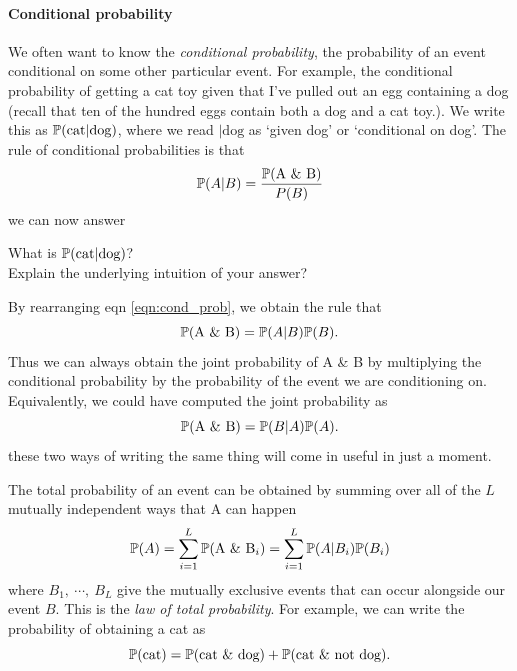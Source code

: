 \paragraph{Conditional probability}
We often want to know the \emph{conditional probability}, the probability of an event conditional on some
other particular event. For example, the conditional probability of getting a cat toy
given that I've pulled out an egg containing a dog (recall that ten of the hundred eggs contain both a dog and a cat toy.). 
We write this as $\P(\textrm{cat} | \textrm{dog})$, where we read $|
\textrm{dog}$ as `given dog' or `conditional on dog'.  The rule of conditional probabilities is that
\begin{equation}
\P(A | B) = \frac{\P(\textrm{A \& B} )}{P(B)}  \label{eqn:cond_prob}
\end{equation}
we can now answer
\begin{question} \label{question:cond}
What is $ \P(\textrm{cat} | \textrm{dog})$?\\
Explain the underlying intuition of your answer? \\
\end{question}
By rearranging eqn \eqref{eqn:cond_prob}, we obtain the rule that
\begin{equation}
\P(\textrm{A \& B}) = \P(A | B) \P(B) .
\end{equation}
Thus we can always obtain the joint probability of A \& B by
multiplying the conditional probability by the probability of the
event we are conditioning on. Equivalently, we could have computed the
joint probability as
\begin{equation}
\P(\textrm{A \& B}) = \P(B | A) \P(A) .
\end{equation}
these two ways of writing the same thing will come in useful in just a
moment.

The total probability of an event can be obtained by summing over
all of the $L$ mutually independent ways that A can happen
\begin{equation}
  \P(A)  = \sum_{i=1}^L \P(\textrm{A \& B$_i$}) = \sum_{i=1}^L \P(A | B_i) \P(B_i)  \label{eqn:law_tot_prob}
\end{equation}
where $B_1,~\cdots,~B_L$ give the mutually exclusive events
that can occur alongside our event $B$. This is the \emph{law of total
  probability}. For example, we can write the probability of obtaining
a cat as
\begin{equation}
 \P(\textrm{cat}) = \P(\textrm{cat \& dog}) + \P(\textrm{cat \& not dog}). 
\end{equation}

